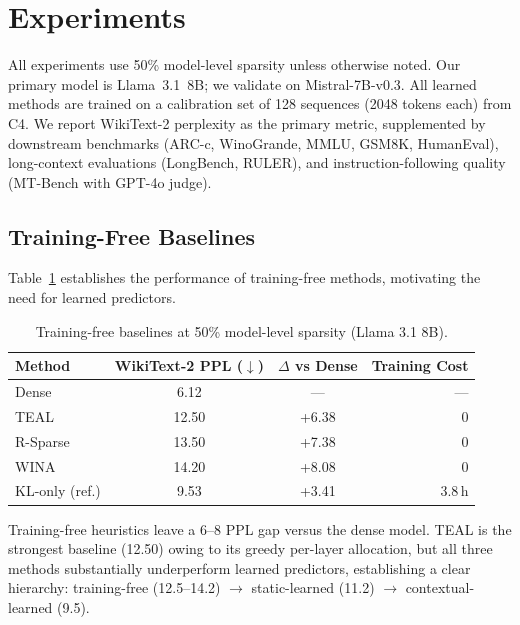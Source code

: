\documentclass[11pt]{article}
\begin{document}
\section{Experiments}

All experiments use 50\% model-level sparsity unless otherwise noted. Our primary model is Llama~3.1~8B; we validate on Mistral-7B-v0.3. All learned methods are trained on a calibration set of 128 sequences (2048 tokens each) from C4. We report WikiText-2 perplexity as the primary metric, supplemented by downstream benchmarks (ARC-c, WinoGrande, MMLU, GSM8K, HumanEval), long-context evaluations (LongBench, RULER), and instruction-following quality (MT-Bench with GPT-4o judge).

\subsection{Training-Free Baselines}
\label{sec:baselines}

Table~\ref{tab:baselines} establishes the performance of training-free methods, motivating the need for learned predictors.

\begin{table}[t]
\centering
\caption{Training-free baselines at 50\% model-level sparsity (Llama 3.1 8B).}
\label{tab:baselines}
\small
\begin{tabular}{lccr}
\toprule
Method & WikiText-2 PPL ($\downarrow$) & $\Delta$ vs Dense & Training Cost \\
\midrule
Dense & 6.12 & --- & --- \\
TEAL & 12.50 & +6.38 & 0 \\
R-Sparse & 13.50 & +7.38 & 0 \\
WINA & 14.20 & +8.08 & 0 \\
\midrule
KL-only (ref.) & 9.53 & +3.41 & 3.8\,h \\
\bottomrule
\end{tabular}
\end{table}

Training-free heuristics leave a 6--8 PPL gap versus the dense model. TEAL is the strongest baseline (12.50) owing to its greedy per-layer allocation, but all three methods substantially underperform learned predictors, establishing a clear hierarchy: training-free (12.5--14.2) $\rightarrow$ static-learned (11.2) $\rightarrow$ contextual-learned (9.5).
\end{document}
